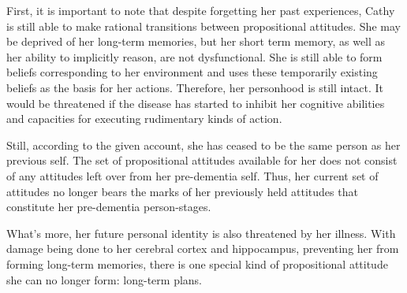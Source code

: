 First, it is important to note that despite forgetting her past
experiences, Cathy is still able to make rational transitions between
propositional attitudes. She may be deprived of her long-term memories,
but her short term memory, as well as her ability to implicitly reason,
are not dysfunctional. She is still able to form beliefs corresponding
to her environment and uses these temporarily existing beliefs as the
basis for her actions. Therefore, her personhood is still intact. It
would be threatened if the disease has started to inhibit her cognitive
abilities and capacities for executing rudimentary kinds of action.

Still, according to the given account, she has ceased to be the same
person as her previous self. The set of propositional attitudes
available for her does not consist of any attitudes left over from her
pre-dementia self. Thus, her current set of attitudes no longer bears
the marks of her previously held attitudes that constitute her
pre-dementia person-stages.

What's more, her future personal identity is also threatened by her
illness. With damage being done to her cerebral cortex and hippocampus,
preventing her from forming long-term memories, there is one special
kind of propositional attitude she can no longer form: long-term plans.

